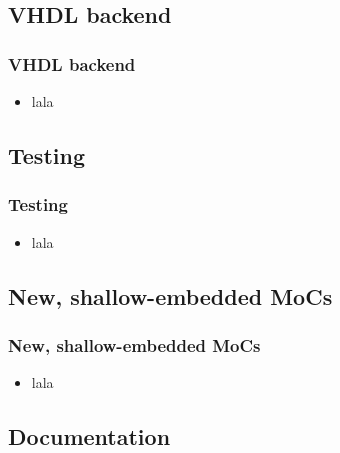 \documentclass{beamer}
\begin{document}
\subsection{VHDL backend}

\begin{frame}[fragile]
  \frametitle{VHDL backend}
  \begin{itemize}
  \item lala
  \end{itemize}
  
\end{frame}

\subsection{Testing}

\begin{frame}
  \frametitle{Testing}
  \begin{itemize}
  \item lala
  \end{itemize}
  
\end{frame}

\subsection{New, shallow-embedded MoCs}

\begin{frame}
  \frametitle{New, shallow-embedded MoCs}
  \begin{itemize}
  \item lala
  \end{itemize}
  
\end{frame}

\subsection{Documentation}
\end{document}
